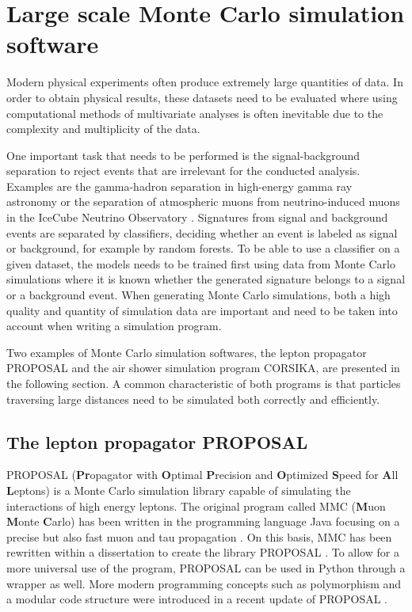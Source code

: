 \chapter{Large scale Monte Carlo simulation software}

Modern physical experiments often produce extremely large quantities of data.
In order to obtain physical results, these datasets need to be evaluated where using computational methods of multivariate analyses is often inevitable due to the complexity and multiplicity of the data.

One important task that needs to be performed is the signal-background separation to reject events that are irrelevant for the conducted analysis.
Examples are the gamma-hadron separation in high-energy gamma ray astronomy \cite{Ohm_2009} or the separation of atmospheric muons from neutrino-induced muons in the IceCube Neutrino Observatory \cite{Ahrens_2004}. 
Signatures from signal and background events are separated by classifiers, deciding whether an event is labeled as signal or background, for example by random forests.
To be able to use a classifier on a given dataset, the models needs to be trained first using data from Monte Carlo simulations where it is known whether the generated signature belongs to a signal or a background event.
When generating Monte Carlo simulations, both a high quality and quantity of simulation data are important and need to be taken into account when writing a simulation program.

Two examples of Monte Carlo simulation softwares, the lepton propagator PROPOSAL and the air shower simulation program CORSIKA, are presented in the following section.
A common characteristic of both programs is that particles traversing large distances need to be simulated both correctly and efficiently.

\section{The lepton propagator PROPOSAL}

PROPOSAL (\textbf{Pr}opagator with \textbf{O}ptimal \textbf{P}recision and \textbf{O}ptimized \textbf{S}peed for \textbf{A}ll \textbf{L}eptons) is a Monte Carlo simulation library capable of simulating the interactions of high energy leptons.
The original program called MMC (\textbf{M}uon \textbf{M}onte \textbf{C}arlo) has been written in the programming language Java focusing on a precise but also fast muon and tau propagation \cite{chirkin2004propagating}.
On this basis, MMC has been rewritten within a dissertation to create the \CC library PROPOSAL \cite{Kohne:2013zbq}.
To allow for a more universal use of the program, PROPOSAL can be used in Python through a wrapper as well.
More modern programming concepts such as polymorphism and a modular code structure were introduced in a recent update of PROPOSAL \cite{dunsch_2018_proposal_improvements}.

